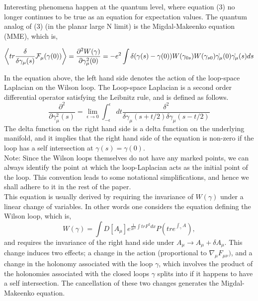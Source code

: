 \documentclass[a4paper,12]{article}
\begin{document}
Interesting phenomena happen at the quantum level, where equation (3) no 
longer continues to be true as an equation for expectation values. The 
quantum analog of (3) (in the planar large N limit) is the Migdal-Makeenko 
equation (MME), which is,

\begin{equation}
\left< tr \frac{\delta }{\delta \gamma _\mu 
(s)}{\cal{F}}_\mu (\gamma(0))\right> = \frac{\partial 
^2 W(\gamma )}{\partial \gamma ^2_\mu (0)} =
-e^2\int\delta(\gamma (s) -\gamma (0))W(\gamma _{0s})W(\gamma
_{s0})\dot{\gamma _\mu}(0)\dot{\gamma _\mu }(s)ds
\end{equation}

In the equation above, the left hand side denotes the action of the 
loop-space Laplacian on the
Wilson loop. The Loop-space Laplacian \cite{Polyakov:glue, 
loopharmonic} is a second 
order differential
operator satisfying the Leibnitz rule, and is defined as follows.
\begin{equation}
\frac{\partial ^2}{\partial \gamma _\mu ^2 (s)} = \lim_{\epsilon \rightarrow 0}\int
_{-\epsilon }^{\epsilon }dt\frac{\delta ^2 }{\delta \gamma _\mu
(s + t/2)\delta \gamma _\mu (s - t/2)}
\end{equation}
The delta function on the right hand side is a
delta function on the underlying manifold, and it implies that the right
hand side of the equation is non-zero if the loop has a self intersection
at $\gamma (s) = \gamma (0)$. \\

Note: Since the Wilson loops themselves do not have any marked points, we 
can always identify the point at which the loop-Laplacian acts as the 
initial point of the loop. This convention leads to some notational 
simplifications, and hence we shall adhere to it in the rest of the 
paper.\\


This equation is usually derived by requiring the invariance of $W(\gamma 
)$ under a linear change of variables. In other words one considers the   
equation defining the Wilson loop, which is,
\begin{equation}
W(\gamma ) = \int D[A_\mu ] e^{\frac{1}{2e^2}\int tr F^2
dx}P\left(tre^{\int_{\gamma }A}\right),
\end{equation}
and  requires the invariance of the right hand side under $A_\mu
\rightarrow A_\mu + \delta A_\mu $. This change induces two effects; a
change in the action (proportional to $\nabla _\mu F_{\mu \nu })$, and a   
change in the holonomy associated with the loop $\gamma $, which involves 
the product of the holonomies associated with the closed loops $\gamma $  
splits into if it happens to have a self intersection. The cancellation of
these two changes generates the Migdal-Makeenko equation.\\
\end{document}
